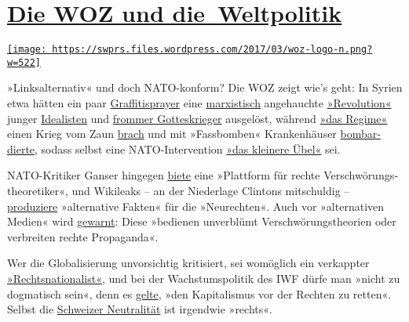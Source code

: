 \hypertarget{die-woz-und-die-weltpolitik}{%
\section{\texorpdfstring{\href{https://swprs.org/2017/03/01/die-woz-und-die-weltpolitik/}{Die
WOZ und
die~Weltpolitik}}{Die WOZ und die~Weltpolitik}}\label{die-woz-und-die-weltpolitik}}

\href{https://swprs.org/2017/03/01/die-woz-und-die-weltpolitik/}{\texttt{[image: https://swprs.files.wordpress.com/2017/03/woz-logo-n.png?w=522]}}

»Linksalternativ« und doch NATO-konform? Die WOZ zeigt wie's geht: In
Syrien etwa hätten ein paar
\href{https://www.woz.ch/1203/syrien/assad-geht-das-licht-aus}{Graffiti­sprayer}
eine
\href{https://www.woz.ch/1616/syriens-zukunft/assads-spiel-mit-dem-westen}{marxis­tisch}
ange­hauchte
\href{https://www.woz.ch/1511/kommentar-von-francois-moore/die-revolution-in-syrien-ist-am-ende}{»Revo­lution«}
junger
\href{https://www.woz.ch/1606/syrien/mithilfe-dieser-verdammten-russen-wird-dieser-bastard-noch-ueberleben}{Idealisten}
und \href{https://www.woz.ch/1235/syrien/kaempfen-und-beten}{frommer
Gottes­krieger} ausgelöst, während
\href{https://www.woz.ch/1324/syrien/ein-land-zersplittert-immer-mehr}{»das
Regime«} einen Krieg vom Zaun
\href{https://www.woz.ch/1321/syrien-und-der-westen/assad-kann-nur-gewinnen}{brach}
und mit »Fass­bomben« Kranken­häuser
\href{https://www.woz.ch/1416/syrien/fassbomben-gottes-wille-und-demokratie}{bombar­dierte},
sodass selbst eine NATO-Inter­vention
\href{https://www.woz.ch/1335/syrien/intervention-als-kleineres-uebel}{»das
kleinere Übel«} sei.

NATO-Kritiker Ganser hingegen
\href{https://www.woz.ch/1703/wahrheit-und-verschwoerung/das-ganser-phaenomen}{biete}
eine »Plattform für rechte Ver­schwö­rungs­theo­retiker«, und Wiki­leaks
-- an der Nieder­lage Clintons mitschuldig --
\href{https://www.woz.ch/1711/cia-dokumente/die-alternativen-fakten-von-wikileaks}{produziere}
»alter­native Fakten« für die »Neurechten«. Auch vor »alter­na­tiven
Medien« wird
\href{https://www.woz.ch/1743/qualitaet-der-medien/unterinformiert-und-ausgeliefert}{gewarnt}:
Diese »bedienen unverblümt Ver­schwörungs­theorien oder ver­breiten
rechte Propaganda«.

Wer die Global­isierung unvor­sichtig kriti­siert, sei womöglich ein
verkappter
\href{https://www.woz.ch/1708/wirtschaftlicher-protektionismus/die-voelkische-kritik-an-der-globalisierung}{»Rechts­nationa­list«},
und bei der Wachs­tums­politik des IWF dürfe man »nicht zu dogma­tisch
sein«, denn es
\href{https://www.woz.ch/1742/weltwirtschaft/die-hueterin-des-kapitalismus}{gelte},
»den Kapita­lismus vor der Rechten zu retten«. Selbst die
\href{https://www.woz.ch/1414/schweizerische-aussenpolitik/opportunistische-neutralitaet}{Schweizer
Neutra­lität} ist irgendwie »rechts«.

